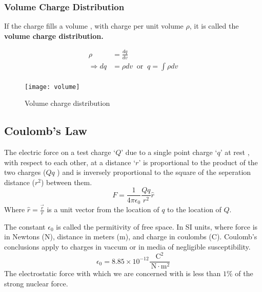 \subsubsection{Volume Charge Distribution}
If the charge fills a volume , with charge per unit volume $\rho$, it is called the \textbf{volume charge distribution.}
\begin{minipage}{0.45\textwidth}
	\begin{align*}
	\rho&=\frac{dq}{d v}\\
	\Longrightarrow d q&=\rho d v\ \text { or } \ q=\int \rho d v\\
	\end{align*}
\end{minipage}\hspace{2cm}
\begin{minipage}{0.45\textwidth}
		\begin{figure}[H]
		\centering
		\texttt{[image: volume]}
		\caption{Volume charge distribution}
		\label{volume}
	\end{figure}
\end{minipage}

\subsection{Coulomb's Law}
\begin{definition}
The electric force on a test charge `$Q$' due to a single point charge `$q$' at rest , with respect to each other,  at a distance `$r$' is proportional to the product of the two charges  ($Qq$ ) and is inversely proportional to the square of the seperation distance ($r^{2}$)  between them.
\begin{equation}
 F={\frac{1}{4\pi \epsilon_{0}}} \frac{Qq}{r^{2}}\hat{r}
\end{equation}
Where  $\hat{{r}}=\frac{\vec{r}}{r}$ is a unit vector from the location of $ q $ to  the location of $ Q $.
\end{definition}
The constant $\epsilon_{0}$ is called the permitivity of free space. In SI units, where force is in Newtons (N), distance in meters (m), and charge in coulombs (C). Coulomb's conclusions apply to charges in vaccum or in media of negligible susceptibility.
$$
\epsilon_{0}=8.85 \times 10^{-12} \frac{\mathrm{C}^{2}}{\mathrm{~N} \cdot \mathrm{m}^{2}}
$$
The electrostatic force with which we are concerned with is less than $1 \%$ of the strong nuclear force.
